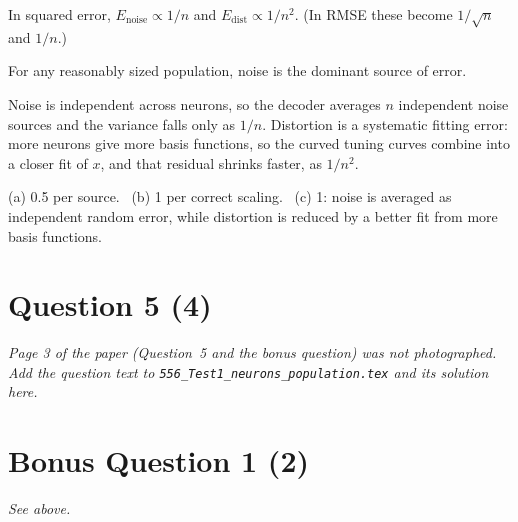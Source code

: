\documentclass[11pt,letterpaper]{article}
\newcommand{\ans}[1]{\par\vspace{4pt}{\bfseries #1}\quad}
\begin{document}
\ans{(b) [2]}
In squared error, $E_{\mathrm{noise}} \propto 1/n$ and $E_{\mathrm{dist}} \propto 1/n^2$. (In RMSE these become $1/\sqrt n$ and $1/n$.)
\begin{center}
\end{center}
For any reasonably sized population, noise is the dominant source of error.

\ans{(c) [1]}
Noise is independent across neurons, so the decoder averages $n$ independent noise sources and the variance falls only as $1/n$. Distortion is a systematic fitting error: more neurons give more basis functions, so the curved tuning curves combine into a closer fit of $x$, and that residual shrinks faster, as $1/n^2$.
\begin{marking}
(a) 0.5 per source. \ (b) 1 per correct scaling. \ (c) 1: noise is averaged as independent random error, while distortion is reduced by a better fit from more basis functions.
\end{marking}

\section*{Question 5 \hfill (4)}
\textit{Page 3 of the paper (Question~5 and the bonus question) was not photographed. Add the question text to \texttt{556\_Test1\_neurons\_population.tex} and its solution here.}

\section*{Bonus Question 1 \hfill (2)}
\textit{See above.}
\end{document}
